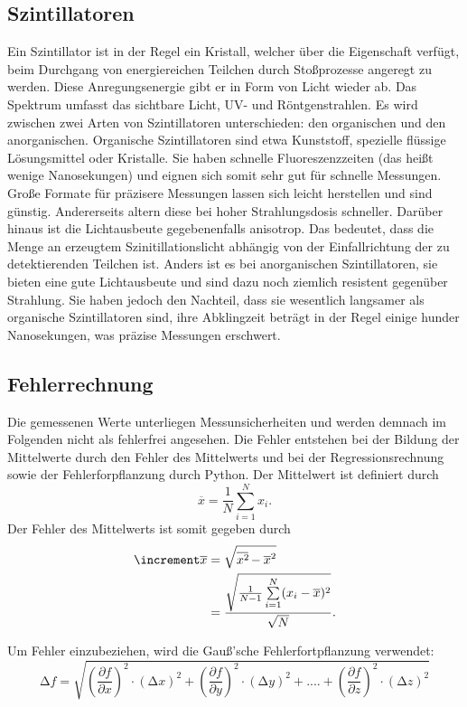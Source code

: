 \subsection{Szintillatoren}
\label{sec:t3}
Ein Szintillator ist in der Regel ein Kristall, welcher über die Eigenschaft 
verfügt, beim Durchgang von energiereichen Teilchen durch Stoßprozesse angeregt
zu werden. Diese Anregungsenergie gibt er in Form von Licht wieder ab. Das 
Spektrum umfasst das sichtbare Licht, UV- und Röntgenstrahlen. Es wird zwischen 
zwei Arten von Szintillatoren unterschieden: den organischen und den anorganischen.
Organische Szintillatoren sind etwa Kunststoff, spezielle flüssige Lösungsmittel 
oder Kristalle. Sie haben schnelle Fluoreszenzzeiten (das heißt wenige Nanosekungen)
und eignen sich somit sehr gut für schnelle Messungen. Große Formate für 
präzisere Messungen lassen sich leicht herstellen und sind günstig. Andererseits 
altern diese bei hoher Strahlungsdosis schneller. Darüber hinaus ist die 
Lichtausbeute gegebenenfalls anisotrop. Das bedeutet, dass die Menge an erzeugtem 
Szinitillationslicht abhängig von der Einfallrichtung der zu detektierenden 
Teilchen ist. Anders ist es bei anorganischen Szintillatoren, sie bieten eine 
gute Lichtausbeute und sind dazu noch ziemlich resistent gegenüber Strahlung.
Sie haben jedoch den Nachteil, dass sie wesentlich langsamer als organische 
Szintillatoren sind, ihre Abklingzeit beträgt in der Regel einige hunder Nanosekungen,
was präzise Messungen erschwert. \cite{Szintillator}

\subsection{Fehlerrechnung}
Die gemessenen Werte unterliegen Messunsicherheiten und werden demnach im
Folgenden nicht als fehlerfrei angesehen. Die Fehler entstehen bei der
Bildung der Mittelwerte durch den Fehler des Mittelwerts und bei der
Regressionsrechnung sowie der Fehlerforpflanzung durch Python.
Der Mittelwert ist definiert durch
\begin{equation}
    \overline{x} = \frac{1}{N} \sum\limits_{i=1}^N x_i.
\end{equation}
\noindent Der Fehler des Mittelwerts ist somit gegeben durch 
\begin{equation}
    \begin{aligned}
        \increment \overline{x} &= \sqrt{\overline{x^2\kern-0.1em} - \overline{x}^2} \\
                            &= \frac{\sqrt{\frac{1}{N-1} \sum\limits_{i=1}^N (x_i - \overline{x})^2}}{\sqrt{N}}.
    \end{aligned}
\end{equation}

\noindent Um Fehler einzubeziehen, wird die Gauß'sche Fehlerfortpflanzung verwendet:
\begin{equation}
    \label{eqn:9}
    \increment f = \sqrt{\left(\frac{\partial f}{\partial x}\right)^2 \cdot \left(\increment x\right)^2 + \left(\frac{\partial f}{\partial y}\right)^2 \cdot \left(\increment y\right)^2 + .... + \left(\frac{\partial f}{\partial z}\right)^2 \cdot \left(\increment z\right)^2}
\end{equation}
